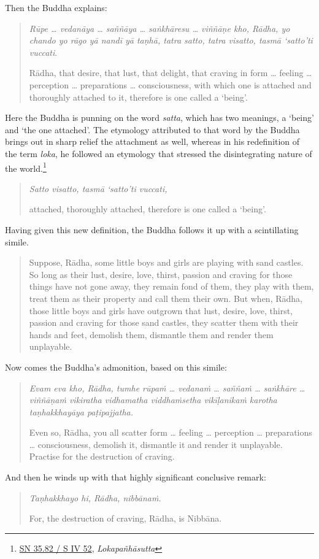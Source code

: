 Then the Buddha explains:

\begin{quote}
\emph{Rūpe \ldots{} vedanāya \ldots{} saññāya \ldots{} saṅkhāresu \ldots{} viññāṇe kho, Rādha, yo chando yo rāgo yā nandī yā taṇhā, tatra satto, tatra visatto, tasmā `satto'ti vuccati}.

Rādha, that desire, that lust, that delight, that craving in form \ldots{} feeling \ldots{} perception \ldots{} preparations \ldots{} consciousness, with which one is attached and thoroughly attached to it, therefore is one called a `being'.
\end{quote}

Here the Buddha is punning on the word \emph{satta}, which has two meanings, a `being' and `the one attached'. The etymology attributed to that word by the Buddha brings out in sharp relief the attachment as well, whereas in his redefinition of the term \emph{loka}, he followed an etymology that stressed the disintegrating nature of the world.\footnote{\href{https://suttacentral.net/sn35.82/pli/ms}{SN 35.82 / S IV 52}, \emph{Lokapañhāsutta}}

\begin{quote}
\emph{Satto visatto, tasmā `satto'ti vuccati,}

attached, thoroughly attached, therefore is one called a `being'.
\end{quote}

Having given this new definition, the Buddha follows it up with a scintillating simile.

\begin{quote}
Suppose, Rādha, some little boys and girls are playing with sand castles. So long as their lust, desire, love, thirst, passion and craving for those things have not gone away, they remain fond of them, they play with them, treat them as their property and call them their own. But when, Rādha, those little boys and girls have outgrown that lust, desire, love, thirst, passion and craving for those sand castles, they scatter them with their hands and feet, demolish them, dismantle them and render them unplayable.
\end{quote}

Now comes the Buddha's admonition, based on this simile:

\begin{quote}
\emph{Evam eva kho, Rādha, tumhe rūpaṁ \ldots{} vedanaṁ \ldots{} saññaṁ \ldots{} saṅkhāre \ldots{} viññāṇaṁ vikiratha vidhamatha viddhaṁsetha vikīḷanikaṁ karotha taṇhakkhayāya paṭipajjatha.}

Even so, Rādha, you all scatter form \ldots{} feeling \ldots{} perception \ldots{} preparations \ldots{} consciousness, demolish it, dismantle it and render it unplayable. Practise for the destruction of craving.
\end{quote}

And then he winds up with that highly significant conclusive remark:

\begin{quote}
\emph{Taṇhakkhayo hi, Rādha, nibbānaṁ.}

For, the destruction of craving, Rādha, is Nibbāna.
\end{quote}
